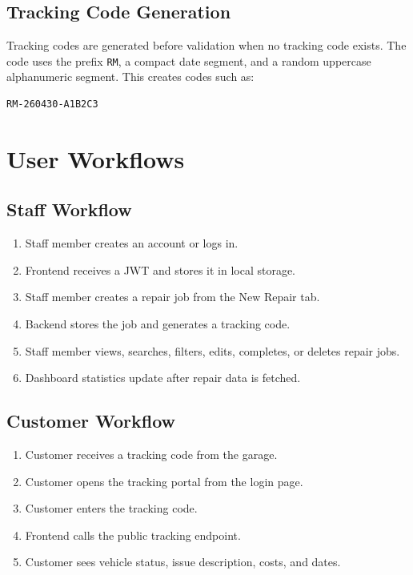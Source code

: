 \documentclass[12pt,a4paper]{report}
\begin{document}
\section{Tracking Code Generation}

Tracking codes are generated before validation when no tracking code exists. The code uses the prefix \texttt{RM}, a compact date segment, and a random uppercase alphanumeric segment. This creates codes such as:

\begin{lstlisting}
RM-260430-A1B2C3
\end{lstlisting}

\chapter{User Workflows}

\section{Staff Workflow}

\begin{enumerate}
  \item Staff member creates an account or logs in.
  \item Frontend receives a JWT and stores it in local storage.
  \item Staff member creates a repair job from the New Repair tab.
  \item Backend stores the job and generates a tracking code.
  \item Staff member views, searches, filters, edits, completes, or deletes repair jobs.
  \item Dashboard statistics update after repair data is fetched.
\end{enumerate}

\section{Customer Workflow}

\begin{enumerate}
  \item Customer receives a tracking code from the garage.
  \item Customer opens the tracking portal from the login page.
  \item Customer enters the tracking code.
  \item Frontend calls the public tracking endpoint.
  \item Customer sees vehicle status, issue description, costs, and dates.
\end{enumerate}
\end{document}
